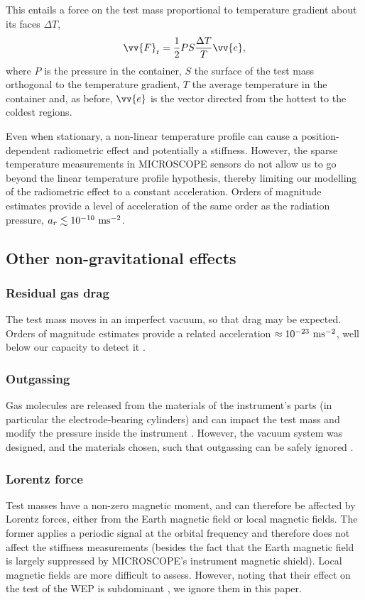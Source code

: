 \documentclass[12pt]{iopart}
\begin{document}
This entails a force on the test mass proportional to temperature gradient about its faces $\Delta T$,
\begin{equation}
\vv{F}_{\rm r} = \frac{1}{2} PS \frac{\Delta T}{T} \vv{e},
\end{equation}
where $P$ is the pressure in the container, $S$ the surface of the test mass orthogonal to the temperature gradient, $T$ the average temperature in the container and, as before, $\vv{e}$ is the vector directed from the hottest to the coldest regions.

Even when stationary, a non-linear temperature profile can cause a position-dependent radiometric effect and potentially a stiffness. However, the sparse temperature measurements in MICROSCOPE sensors do not allow us to go beyond the linear temperature profile hypothesis, thereby limiting our modelling of the radiometric effect to a constant acceleration. %
Orders of magnitude estimates provide a level of acceleration of the same order as the radiation pressure, $a_r \lesssim 10^{-10}~{\rm ms}^{-2}$.


\subsection{Other non-gravitational effects}


\subsubsection{Residual gas drag} The test mass moves in an imperfect vacuum, so that drag may be expected. Orders of magnitude estimates provide a related acceleration $\approx 10^{-23}~{\rm ms}^{-2}$, well below our capacity to detect it \cite{liorzou20}.

\subsubsection{Outgassing} Gas molecules are released from the materials of the instrument's parts (in particular the electrode-bearing cylinders) and can impact the test mass and modify the pressure inside the instrument \cite{nofrarias07}. However, the vacuum system was designed, and the materials chosen, such that outgassing can be safely ignored \cite{liorzou20}.

\subsubsection{Lorentz force} Test masses have a non-zero magnetic moment, and can therefore be affected by Lorentz forces, either from the Earth magnetic field or local magnetic fields. The former applies a periodic signal at the orbital frequency and therefore does not affect the stiffness measurements (besides the fact that the Earth magnetic field is largely suppressed by MICROSCOPE's instrument magnetic shield). Local magnetic fields are more difficult to assess. However, noting that their effect on the test of the WEP is subdominant \cite{hardycqg6}, we ignore them in this paper.
\end{document}
